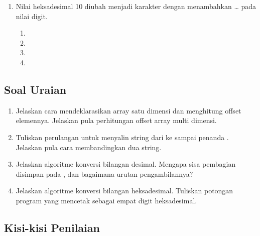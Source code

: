 \begin{enumerate}
    \item Nilai heksadesimal 10 diubah menjadi karakter 
          dengan menambahkan \dots{} pada nilai digit.
          \begin{enumerate}
              \item {} \item {}
              \item {} \item {}
          \end{enumerate}
\end{enumerate}

\subsection{Soal Uraian}

\begin{enumerate}
    \item Jelaskan cara mendeklarasikan array satu dimensi dan
          menghitung offset elemennya. Jelaskan pula perhitungan
          offset array multi dimensi.

    \item Tuliskan perulangan untuk menyalin string dari  ke
           sampai penanda . Jelaskan pula cara
          membandingkan dua string.

    \item Jelaskan algoritme konversi bilangan desimal. Mengapa sisa
          pembagian disimpan pada , dan bagaimana urutan
          pengambilannya?

    \item Jelaskan algoritme konversi bilangan heksadesimal. Tuliskan
          potongan program yang mencetak  sebagai empat digit
          heksadesimal.
\end{enumerate}

\subsection{Kisi-kisi Penilaian}


